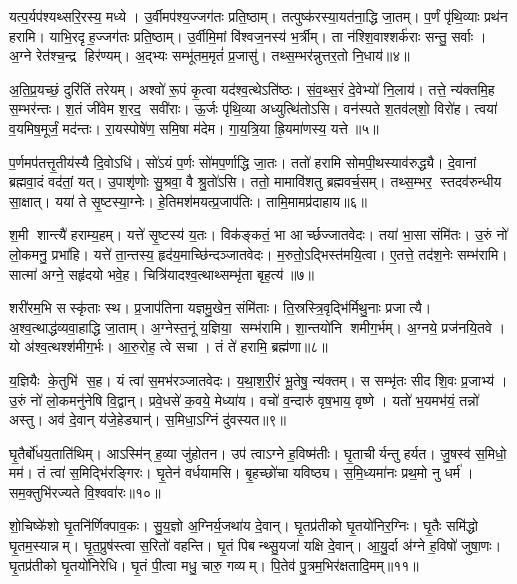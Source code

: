 यत्प॒र्यप॑श्यथ्सरि॒रस्य॒ मध्ये। उ॒र्वीमप॑श्य॒ज्जग॑तः प्रति॒ष्ठाम्। तत्पुष्क॑रस्या॒यत॑ना॒द्धि जा॒तम्। प॒र्णं पृ॑थि॒व्याः प्रथ॑न हरामि। याभि॒रदृह॒ज्जग॑तः प्रति॒ष्ठाम्। उ॒र्वीमि॒मां वि॑श्वज॒नस्य॑ भ॒र्त्रीम्। ता न॑श्शि॒वाश्शर्क॑राः सन्तु॒ सर्वाः। अ॒ग्ने रेत॑श्च॒न्द्र हिर॑ण्यम्। अ॒द्भ्यः सम्भू॑तम॒मृतं॑ प्र॒जासु॑। तथ्स॒म्भर॑न्नुत्तर॒तो नि॒धाय॑॥४॥

अ॒ति॒प्र॒यच्छं॒ दुरि॑तिं तरेयम्। अश्वो॑ रू॒पं कृ॒त्वा यद॑श्व॒त्थेऽति॑ष्ठः। सं॒व॒थ्स॒रं दे॒वेभ्यो॑ नि॒लाय॑। तत्ते॒ न्य॑क्तमि॒ह स॒म्भर॑न्तः। श॒तं जी॑वेम श॒रद॒ सवी॑राः। ऊ॒र्जः पृ॑थि॒व्या अध्युत्थि॑तोऽसि। वन॑स्पते श॒तव॑ल्‌शो॒ विरो॑ह। त्वया॑ व॒यमिष॒मूर्जं॒ मद॑न्तः। रा॒यस्पोषे॑ण॒ समि॒षा म॑देम। गा॒य॒त्रि॒या ह्रि॒यमा॑णस्य॒ यत्ते॥५॥

प॒र्णमप॑तत्तृ॒तीय॑स्यै दि॒वोऽधि॑। सो॑ऽयं प॒र्णः सो॑मप॒र्णाद्धि जा॒तः। ततो॑ हरामि सोमपी॒थस्याव॑रुद्ध्यै। दे॒वानां ब्रह्मवा॒दं वद॑तां॒ यत्। उ॒पाशृ॑णोः सु॒श्रवा॒ वै श्रु॒तो॑ऽसि। ततो॒ मामावि॑शतु ब्रह्मवर्च॒सम्। तथ्स॒म्भर॒ स्तदव॑रुन्धीय सा॒क्षात्। यया॑ ते सृ॒ष्टस्या॒ग्नेः। हे॒तिमश॑मयत्प्र॒जाप॑तिः। तामि॒मामप्र॑दाहाय॥६॥

श॒मी शान्त्यै॑ हराम्य॒हम्। यत्ते॑ सृ॒ष्टस्य॑ य॒तः। विक॑ङ्कतं॒ भा आर्च्छज्जातवेदः। तया॑ भा॒सा संमि॑तः। उ॒रुं नो॑ लो॒कमनु॒ प्रभा॑हि। यत्ते॑ ता॒न्तस्य॒ हृद॑य॒माच्छि॑न्दञ्जातवेदः। म॒रुतो॒ऽद्भिस्त॑मयि॒त्वा। ए॒तत्ते॒ तद॑श॒नेः सम्भ॑रामि। सात्मा॑ अग्ने॒ सहृ॑दयो भवे॒ह। चित्रि॑यादश्व॒त्थाथ्सम्भृ॑ता बृह॒त्य॑॥७॥

शरी॑रम॒भि सस्कृ॑ताः स्थ। प्र॒जाप॑तिना यज्ञमु॒खेन॒ संमि॑ताः। ति॒स्रस्त्रि॒वृद्भि॑र्मिथु॒नाः प्रजात्यै। अ॒श्व॒त्थाद्ध॑व्यवा॒हाद्धि जा॒ताम्। अ॒ग्नेस्त॒नूं य॒ज्ञिया॒ सम्भ॑रामि। शा॒न्तयो॑नि शमीग॒र्भम्। अ॒ग्नये॒ प्रज॑नयि॒तवे। यो अ॑श्व॒त्थश्श॑मीग॒र्भः। आ॒रु॒रोह॒ त्वे सचा। तं ते॑ हरामि॒ ब्रह्म॑णा॥८॥

य॒ज्ञियैः के॒तुभि॑ स॒ह। यं त्वा॑ स॒मभ॑रञ्जातवेदः। य॒था॒श॒री॒रं भू॒तेषु॒ न्य॑क्तम्। स सम्भृ॑तः सीद शि॒वः प्र॒जाभ्य॑। उ॒रुं नो॑ लो॒कमनु॑नेषि वि॒द्वान्। प्रवे॒धसे॑ क॒वये॒ मेध्या॑य। वचो॑ व॒न्दारु॑ वृष॒भाय॒ वृष्णे। यतो॑ भ॒यमभ॑यं॒ तन्नो॑ अस्तु। अव॑ दे॒वान् य॑जे॒हेड्यान्॑। स॒मिधा॒ऽग्निं दु॑वस्यत॥९॥

घृ॒तैर्बो॑धय॒ताति॑थिम्। आऽस्मि॑न् ह॒व्या जु॑होतन। उप॑ त्वाऽग्ने ह॒विष्म॑तीः। घृ॒ताचीर्यन्तु हर्यत। जु॒षस्व॑ स॒मिधो॒ मम॑। तं त्वा॑ स॒मिद्भि॑रङ्गिरः। घृ॒तेन॑ वर्धयामसि। बृ॒हच्छो॑चा यविष्ठ्य। स॒मि॒ध्यमा॑नः प्रथ॒मो नु धर्म॑। सम॒क्तुभि॑रज्यते वि॒श्ववा॑रः॥१०॥

शो॒चिष्के॑शो घृ॒तनि॑र्णिक्पाव॒कः। सु॒य॒ज्ञो अ॒ग्निर्य॒जथा॑य दे॒वान्। घृ॒तप्र॑तीको घृ॒तयो॑निर॒ग्निः। घृ॒तैः समि॑द्धो घृ॒तम॒स्यान्नम्। घृ॒त॒प्रुष॑स्त्वा स॒रितो॑ वहन्ति। घृ॒तं पिबन्थ्सु॒यजा॑ यक्षि दे॒वान्। आ॒यु॒र्दा अ॑ग्ने ह॒विषो॑ जुषा॒णः। घृ॒तप्र॑तीको घृ॒तयो॑निरेधि। घृ॒तं पी॒त्वा मधु॒ चारु॒ गव्यम्। पि॒तेव॑ पु॒त्रम॒भिर॑क्षतादि॒मम्॥११॥

